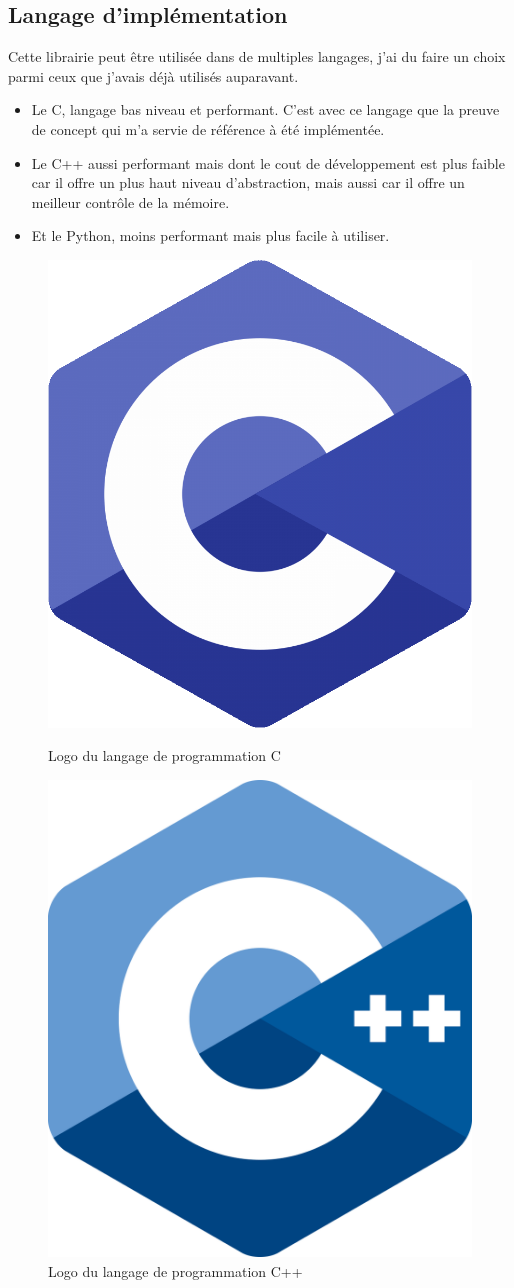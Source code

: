 \documentclass[12pt, a4paper]{report}
\begin{document}
\subsection{Langage d'implémentation}
Cette librairie peut être utilisée dans de multiples langages, j'ai du faire un choix parmi ceux que j'avais déjà utilisés auparavant.\newline
\begin{itemize}
    \item Le C, langage bas niveau et performant. C'est avec ce langage que la preuve de concept qui m'a servie de référence à été implémentée.\newline
    \item Le C++ aussi performant mais dont le cout de développement est plus faible car il offre un plus haut niveau d'abstraction, mais aussi car il offre un meilleur contrôle de la mémoire.\newline
    \item Et le Python, moins performant mais plus facile à utiliser.
\end{itemize}
\begin{figure}[H]
    \begin{minipage}{.5\textwidth}
        \centering
        \includegraphics[width=.5\textwidth]{c.png}
        \caption{Logo du langage de programmation C}
    \end{minipage}
    \begin{minipage}{.5\textwidth}
        \centering
        \includegraphics[width=.5\textwidth]{cpp.png}
        \caption{Logo du langage de programmation C++}
    \end{minipage}
\end{figure}
\end{document}
